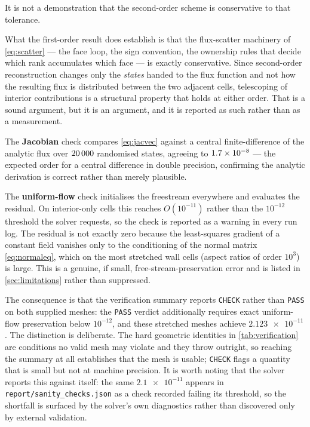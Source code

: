 It is not a demonstration that the second-order scheme is conservative to that tolerance.

What the first-order result does establish is that the flux-scatter machinery of
\cref{eq:scatter} --- the face loop, the sign convention, the ownership rules that
decide which rank accumulates which face --- is exactly conservative. Since
second-order reconstruction changes only the \emph{states} handed to the flux
function and not how the resulting flux is distributed between the two adjacent
cells, telescoping of interior contributions is a structural property that holds
at either order. That is a sound argument, but it is an argument, and it is
reported as such rather than as a measurement.

The \textbf{Jacobian} check compares \cref{eq:jacvec} against a central
finite-difference of the analytic flux over $20\,000$ randomised states,
agreeing to $1.7\times10^{-8}$ --- the expected order for a central difference in
double precision, confirming the analytic derivation is correct rather than
merely plausible.

The \textbf{uniform-flow} check initialises the freestream everywhere and
evaluates the residual. On interior-only cells this reaches $O(10^{-11})$ rather
than the $10^{-12}$ threshold the solver requests, so the check is reported as a
warning in every run log. The residual is not exactly zero because the
least-squares gradient of a constant field vanishes only to the conditioning of
the normal matrix \cref{eq:normaleq}, which on the most stretched wall cells
(aspect ratios of order $10^3$) is large. This is a genuine, if small,
free-stream-preservation error and is listed in \cref{sec:limitations} rather
than suppressed.

The consequence is that the verification summary reports \texttt{CHECK} rather than
\texttt{PASS} on both supplied meshes: the \texttt{PASS} verdict additionally
requires exact uniform-flow preservation below $10^{-12}$, and these stretched
meshes achieve $\num{2.123e-11}$. The distinction is deliberate. The hard geometric
identities in \cref{tab:verification} are conditions no valid mesh may violate and
they throw outright, so reaching the summary at all establishes that the mesh is
usable; \texttt{CHECK} flags a quantity that is small but not at machine precision.
It is worth noting that the solver reports this against itself: the same
$\num{2.1e-11}$ appears in \texttt{report/sanity\_checks.json} as a check recorded
failing its threshold, so the shortfall is surfaced by the solver's own diagnostics
rather than discovered only by external validation.

